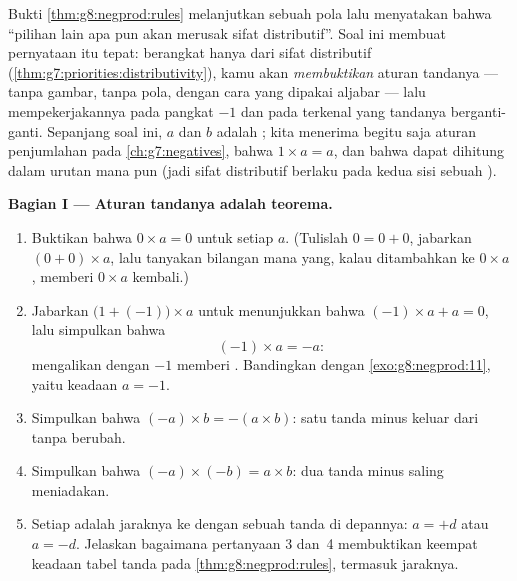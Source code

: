 \begin{problem}
\label{pb:g8:negprod:1}
Bukti \cref{thm:g8:negprod:rules} melanjutkan sebuah pola lalu
menyatakan bahwa ``pilihan lain apa pun akan merusak sifat
distributif''. Soal ini membuat pernyataan itu tepat: berangkat hanya
dari sifat distributif
(\cref{thm:g7:priorities:distributivity}), kamu akan
\emph{membuktikan} aturan tandanya --- tanpa gambar, tanpa pola,
dengan cara yang dipakai aljabar --- lalu mempekerjakannya pada
pangkat $-1$ dan pada  terkenal yang tandanya berganti-ganti.
Sepanjang soal ini, $a$ dan $b$ adalah ; kita
menerima begitu saja aturan penjumlahan pada \cref{ch:g7:negatives},
bahwa $1 \times a = a$, dan bahwa  dapat dihitung dalam
urutan mana pun (jadi sifat distributif berlaku pada kedua sisi
sebuah ).

\medskip
\noindent\textbf{Bagian I --- Aturan tandanya adalah teorema.}
\begin{enumerate}
  \item Buktikan bahwa $0 \times a = 0$ untuk setiap  $a$. (Tulislah $0 = 0 + 0$, jabarkan
        $(0 + 0) \times a$, lalu tanyakan bilangan mana yang, kalau
        ditambahkan ke $0 \times a$, memberi $0 \times a$ kembali.)
  \item Jabarkan $\bigl(1 + (-1)\bigr) \times a$ untuk menunjukkan
        bahwa $(-1) \times a + a = 0$, lalu simpulkan bahwa
        \[
        (-1) \times a = -a :
        \]
        mengalikan dengan $-1$ memberi . Bandingkan dengan
        \cref{exo:g8:negprod:11}, yaitu keadaan $a = -1$.
  \item Simpulkan bahwa $(-a) \times b = -(a \times b)$: satu tanda
        minus keluar dari  tanpa berubah.
  \item Simpulkan bahwa $(-a) \times (-b) = a \times b$: dua tanda
        minus saling meniadakan.
  \item Setiap  adalah jaraknya ke  dengan sebuah
        tanda di depannya: $a = +d$ atau $a = -d$. Jelaskan bagaimana
        pertanyaan 3 dan~4 membuktikan keempat keadaan tabel tanda
        pada \cref{thm:g8:negprod:rules}, termasuk jaraknya.
\end{enumerate}


\end{problem}
